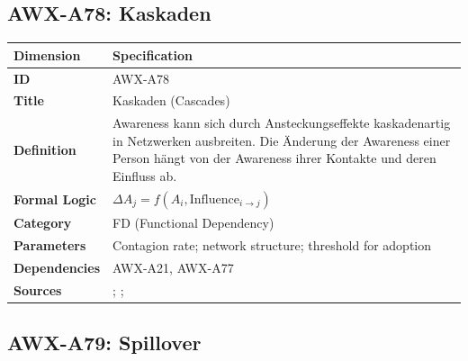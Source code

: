 
\subsection{AWX-A78: Kaskaden}

\begin{table}[htbp]
\small
\begin{tabular}{p{3cm}p{11cm}}
\toprule
\textbf{Dimension} & \textbf{Specification} \\
\midrule
\textbf{ID} & AWX-A78 \\
\textbf{Title} & Kaskaden (Cascades) \\
\textbf{Definition} & Awareness kann sich durch Ansteckungseffekte kaskadenartig in Netzwerken ausbreiten. Die Änderung der Awareness einer Person hängt von der Awareness ihrer Kontakte und deren Einfluss ab. \\
\textbf{Formal Logic} & $\Delta A_j = f(A_i, \text{Influence}_{i \rightarrow j})$ \\
\textbf{Category} & FD (Functional Dependency) \\
\textbf{Parameters} & Contagion rate; network structure; threshold for adoption \\
\textbf{Dependencies} & AWX-A21, AWX-A77 \\
\textbf{Sources} & \citet{bikhchandani1992theory}; \citet{banerjee1992simple}; \citet{watts2002simple} \\
\bottomrule
\end{tabular}
\end{table}


\subsection{AWX-A79: Spillover}

